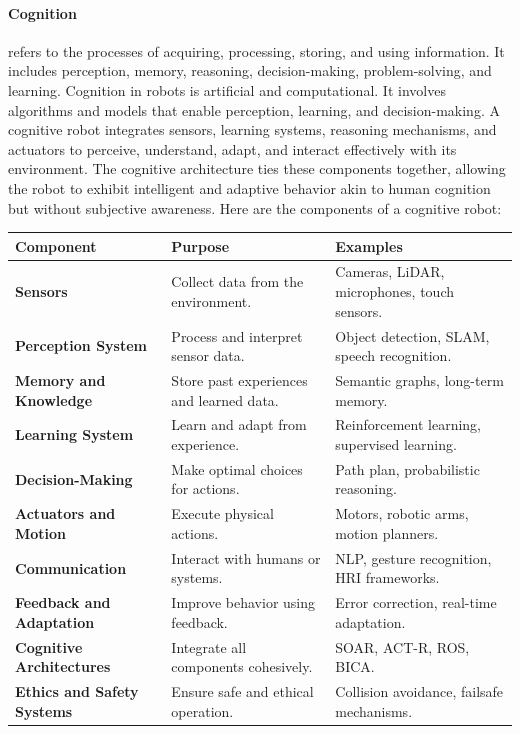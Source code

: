 \documentclass{book}
\begin{document}
\paragraph{Cognition}
refers to the processes of acquiring, processing, storing, and using information. It includes perception, memory, reasoning, decision-making, problem-solving, and learning. Cognition in robots is artificial and computational. It involves algorithms and models that enable perception, learning, and decision-making. A cognitive robot integrates sensors, learning systems, reasoning mechanisms, and actuators to perceive, understand, adapt, and interact effectively with its environment. The cognitive architecture ties these components together, allowing the robot to exhibit intelligent and adaptive behavior akin to human cognition but without subjective awareness. Here are the components of a cognitive robot:
    \begin{tabular}{|l|l|l|}
        \hline
        \textbf{Component} & \textbf{Purpose} & \textbf{Examples} \\ \hline
        \textbf{Sensors} & Collect data from the environment. & Cameras, LiDAR, microphones, touch sensors. \\ \hline
        \textbf{Perception System} & Process and interpret sensor data. & Object detection, SLAM, speech recognition. \\ \hline
        \textbf{Memory and Knowledge} & Store past experiences and learned data. & Semantic graphs, long-term memory. \\ \hline
        \textbf{Learning System} & Learn and adapt from experience. & Reinforcement learning, supervised learning. \\ \hline
        \textbf{Decision-Making} & Make optimal choices for actions. & Path plan, probabilistic reasoning. \\ \hline
        \textbf{Actuators and Motion} & Execute physical actions. & Motors, robotic arms, motion planners. \\ \hline
        \textbf{Communication} & Interact with humans or systems. & NLP, gesture recognition, HRI frameworks. \\ \hline
        \textbf{Feedback and Adaptation} & Improve behavior using feedback. & Error correction, real-time adaptation. \\ \hline
        \textbf{Cognitive Architectures} & Integrate all components cohesively. & SOAR, ACT-R, ROS, BICA. \\ \hline
        \textbf{Ethics and Safety Systems} & Ensure safe and ethical operation. & Collision avoidance, failsafe mechanisms. \\ \hline
    \end{tabular}
\end{document}
